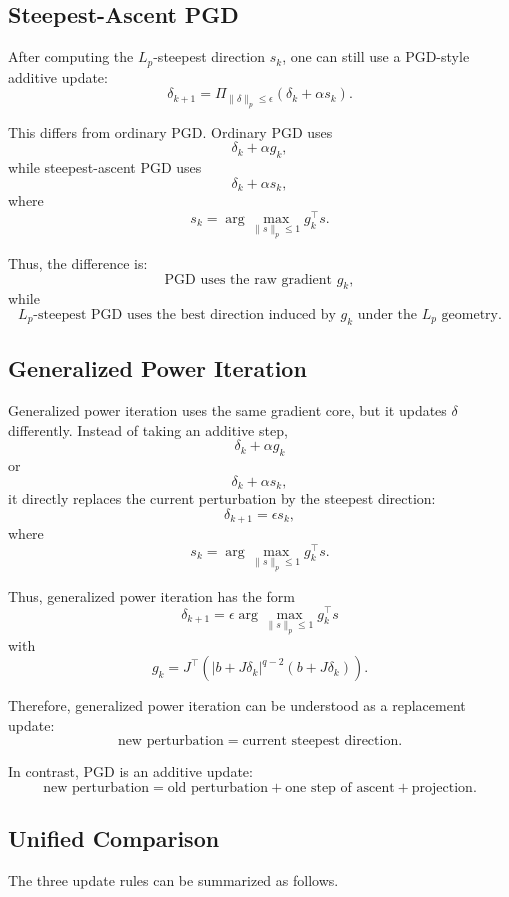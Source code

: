 \documentclass{article}
\begin{document}
\subsection{Steepest-Ascent PGD}

After computing the $L_p$-steepest direction $s_k$, one can still use a PGD-style additive update:
\[
\delta_{k+1}
=
\Pi_{\|\delta\|_p\le \epsilon}
\left(
\delta_k+\alpha s_k
\right).
\]

This differs from ordinary PGD. Ordinary PGD uses
\[
\delta_k+\alpha g_k,
\]
while steepest-ascent PGD uses
\[
\delta_k+\alpha s_k,
\]
where
\[
s_k
=
\arg\max_{\|s\|_p\le 1} g_k^\top s.
\]

Thus, the difference is:
\[
\text{PGD uses the raw gradient } g_k,
\]
while
\[
\text{$L_p$-steepest PGD uses the best direction induced by } g_k
\text{ under the } L_p \text{ geometry}.
\]

\subsection{Generalized Power Iteration}

Generalized power iteration uses the same gradient core, but it updates $\delta$ differently. Instead of taking an additive step,
\[
\delta_k+\alpha g_k
\]
or
\[
\delta_k+\alpha s_k,
\]
it directly replaces the current perturbation by the steepest direction:
\[
\delta_{k+1}
=
\epsilon s_k,
\]
where
\[
s_k
=
\arg\max_{\|s\|_p\le 1}
g_k^\top s.
\]

Thus, generalized power iteration has the form
\[
\boxed{
\delta_{k+1}
=
\epsilon
\arg\max_{\|s\|_p\le 1}
g_k^\top s
}
\]
with
\[
g_k
=
J^\top\left(
|b+J\delta_k|^{q-2}(b+J\delta_k)
\right).
\]

Therefore, generalized power iteration can be understood as a replacement update:
\[
\text{new perturbation}
=
\text{current steepest direction}.
\]

In contrast, PGD is an additive update:
\[
\text{new perturbation}
=
\text{old perturbation}
+
\text{one step of ascent}
+
\text{projection}.
\]

\subsection{Unified Comparison}

The three update rules can be summarized as follows.
\end{document}
